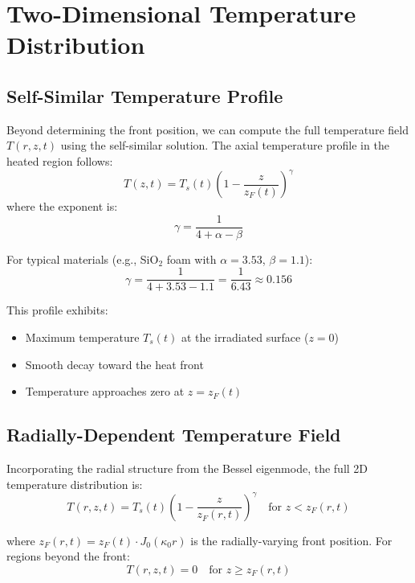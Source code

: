 \documentclass[12pt,a4paper]{article}
\begin{document}
\section{Two-Dimensional Temperature Distribution}

\subsection{Self-Similar Temperature Profile}

Beyond determining the front position, we can compute the full temperature field $T(r,z,t)$ using the self-similar solution. The axial temperature profile in the heated region follows:
\begin{equation}
T(z,t) = T_s(t) \left(1 - \frac{z}{z_F(t)}\right)^{\gamma}
\end{equation}
where the exponent is:
\begin{equation}
\gamma = \frac{1}{4 + \alpha - \beta}
\end{equation}

For typical materials (e.g., SiO$_2$ foam with $\alpha = 3.53$, $\beta = 1.1$):
\begin{equation}
\gamma = \frac{1}{4 + 3.53 - 1.1} = \frac{1}{6.43} \approx 0.156
\end{equation}

This profile exhibits:
\begin{itemize}
    \item Maximum temperature $T_s(t)$ at the irradiated surface ($z=0$)
    \item Smooth decay toward the heat front
    \item Temperature approaches zero at $z = z_F(t)$
\end{itemize}

\subsection{Radially-Dependent Temperature Field}

Incorporating the radial structure from the Bessel eigenmode, the full 2D temperature distribution is:
\begin{equation}
\boxed{T(r,z,t) = T_s(t) \left(1 - \frac{z}{z_F(r,t)}\right)^{\gamma} \quad \text{for } z < z_F(r,t)}
\end{equation}

where $z_F(r,t) = z_F(t) \cdot J_0(\kappa_0 r)$ is the radially-varying front position. For regions beyond the front:
\begin{equation}
T(r,z,t) = 0 \quad \text{for } z \geq z_F(r,t)
\end{equation}
\end{document}
